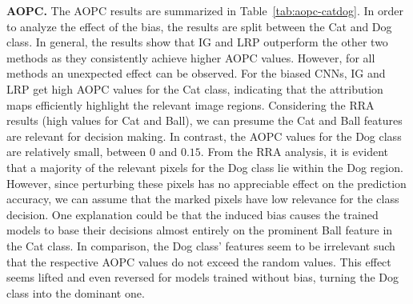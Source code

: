 \documentclass[runningheads]{llncs}
\newcommand{\Tab}[1]{Table~\ref{#1}}
\begin{document}
\textbf{AOPC.}
The AOPC results are summarized in \Tab{tab:aopc-catdog}. In order to analyze the effect of the bias, the results are split between the Cat and Dog class. In general, the results show that IG and LRP outperform the other two methods as they consistently achieve higher AOPC values. However, for all methods an unexpected effect can be observed.
For the biased CNNs, IG and LRP get high AOPC values for the Cat class, indicating that the attribution maps efficiently highlight the relevant image regions. Considering the RRA results (high values for Cat and Ball), we can presume the Cat and Ball features are relevant for decision making. In contrast, the AOPC values for the Dog class are relatively small, between $0$ and $0.15$. From the RRA analysis, it is evident that a majority of the relevant pixels for the Dog class lie within the Dog region. However, since perturbing these pixels has no appreciable effect on the prediction accuracy, we can assume that the marked pixels have low relevance for the class decision.
One explanation could be that the induced bias causes the trained models to base their decisions almost entirely on the prominent Ball feature in the Cat class. In comparison, the Dog class' features seem to be irrelevant such that the respective AOPC values do not exceed the random values. This effect seems lifted and even reversed for models trained without bias, turning the Dog class into the dominant one.
\end{document}
